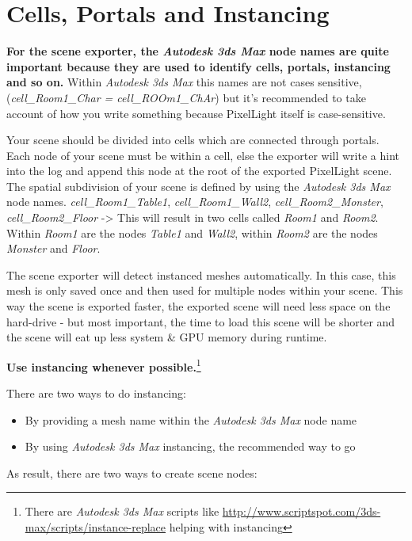 \chapter{Cells, Portals and Instancing}
\textbf{For the scene exporter, the \emph{Autodesk 3ds Max} node names are quite important because they are used to identify cells, portals, instancing and so on.} Within \emph{Autodesk 3ds Max} this names are not cases sensitive, (\emph{cell\_Room1\_Char = cell\_ROOm1\_ChAr}) but it's recommended to take account of how you write something because PixelLight itself is case-sensitive.

Your scene should be divided into cells which are connected through portals. Each node of your scene must be within a cell, else the exporter will write a hint into the log and append this node at the root of the exported PixelLight scene. The spatial subdivision of your scene is defined by using the \emph{Autodesk 3ds Max} node names. \emph{cell\_Room1\_Table1}, \emph{cell\_Room1\_Wall2}, \emph{cell\_Room2\_Monster}, \emph{cell\_Room2\_Floor} -> This will result in two cells called \emph{Room1} and \emph{Room2}. Within \emph{Room1} are the nodes \emph{Table1} and \emph{Wall2}, within \emph{Room2} are the nodes \emph{Monster} and \emph{Floor}.

The scene exporter will detect instanced meshes automatically. In this case, this mesh is only saved once and then used for multiple nodes within your scene. This way the scene is exported faster, the exported scene will need less space on the hard-drive - but most important, the time to load this scene will be shorter and the scene will eat up less system \& \ac{GPU} memory during runtime.

\textbf{Use instancing whenever possible.}\footnote{There are \emph{Autodesk 3ds Max} scripts like \url{http://www.scriptspot.com/3ds-max/scripts/instance-replace} helping with instancing}

There are two ways to do instancing:

\begin{itemize}
\item{By providing a mesh name within the \emph{Autodesk 3ds Max} node name}
\item{By using \emph{Autodesk 3ds Max} instancing, the recommended way to go}
\end{itemize}

As result, there are two ways to create scene nodes:

